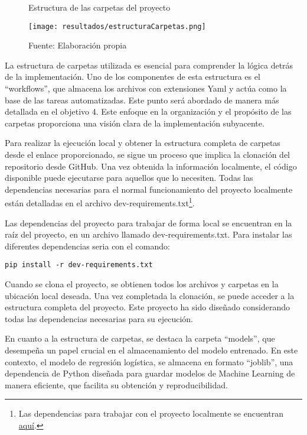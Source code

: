 \begin{figure}[h]
\centering
\caption{Estructura de las carpetas del proyecto}
\texttt{[image: resultados/estructuraCarpetas.png]}
\caption*{\footnotesize Fuente: Elaboración propia}
\label{fig:figuraEstructuraCarpetas}
\end{figure}

\newpage

La estructura de carpetas utilizada es esencial para comprender la lógica detrás de la implementación. Uno de los componentes de esta estructura es el ``workflows'', que almacena los archivos con extensiones Yaml y actúa como la base de las tareas automatizadas. Este punto será abordado de manera más detallada en el objetivo 4. Este enfoque en la organización y el propósito de las carpetas proporciona una visión clara de la implementación subyacente. \newline

Para realizar la ejecución local y obtener la estructura completa de carpetas desde el enlace proporcionado, se sigue un proceso que implica la clonación del repositorio desde GitHub. Una vez obtenida la información localmente, el código disponible puede ejecutarse para aquellos que lo necesiten. Todas las dependencias necesarias para el normal funcionamiento del proyecto localmente están detalladas en el archivo dev-requirements.txt\footnote{Las dependencias para trabajar con el proyecto localmente se encuentran \href{https://github.com/juferoto/mlops_project/blob/master/dev-requirements.txt}{aquí}.}. \newline

Las dependencias del proyecto para trabajar de forma local se encuentran en la raíz del proyecto, en un archivo llamado dev-requirements.txt. Para instalar las diferentes dependencias seria con el comando: 
\begin{verbatim}
pip install -r dev-requirements.txt
\end{verbatim}

Cuando se clona el proyecto, se obtienen todos los archivos y carpetas en la ubicación local deseada. Una vez completada la clonación, se puede acceder a la estructura completa del proyecto. Este proyecto ha sido diseñado considerando todas las dependencias necesarias para su ejecución. \newline

En cuanto a la estructura de carpetas, se destaca la carpeta ``models'', que desempeña un papel crucial en el almacenamiento del modelo entrenado. En este contexto, el modelo de regresión logística, se almacena en formato “joblib”, una dependencia de Python diseñada para guardar modelos de Machine Learning de manera eficiente, que facilita su obtención y reproducibilidad. \newline

